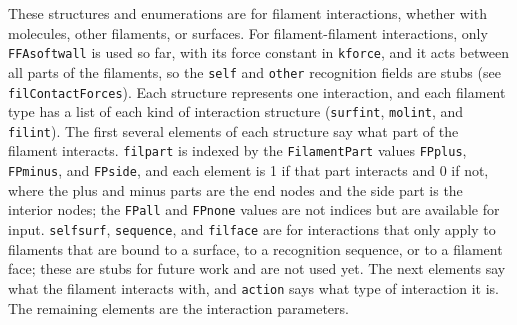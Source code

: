 \documentclass {scrbook}
\newcommand {\ttt} {\texttt}
\begin{document}
These structures and enumerations are for filament interactions, whether with molecules, other filaments, or surfaces. For filament-filament interactions, only \ttt{FFAsoftwall} is used so far, with its force constant in \ttt{kforce}, and it acts between all parts of the filaments, so the \ttt{self} and \ttt{other} recognition fields are stubs (see \ttt{filContactForces}). Each structure represents one interaction, and each filament type has a list of each kind of interaction structure (\ttt{surfint}, \ttt{molint}, and \ttt{filint}). The first several elements of each structure say what part of the filament interacts. \ttt{filpart} is indexed by the \ttt{FilamentPart} values \ttt{FPplus}, \ttt{FPminus}, and \ttt{FPside}, and each element is 1 if that part interacts and 0 if not, where the plus and minus parts are the end nodes and the side part is the interior nodes; the \ttt{FPall} and \ttt{FPnone} values are not indices but are available for input. \ttt{selfsurf}, \ttt{sequence}, and \ttt{filface} are for interactions that only apply to filaments that are bound to a surface, to a recognition sequence, or to a filament face; these are stubs for future work and are not used yet. The next elements say what the filament interacts with, and \ttt{action} says what type of interaction it is. The remaining elements are the interaction parameters.
\end{document}
